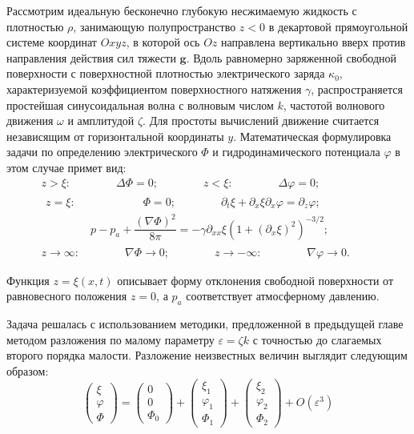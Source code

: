 Рассмотрим идеальную бесконечно глубокую несжимаемую жидкость с плотностью  $ \rho $, занимающую полупространство $ z<0 $  в декартовой прямоугольной системе координат  $ Oxyz $, в которой ось $ Oz $  направлена вертикально вверх против направления действия сил тяжести  $ \mathbf{g} $. Вдоль равномерно заряженной свободной поверхности с поверхностной плотностью электрического заряда  $ \kappa_{0} $, характеризуемой коэффициентом поверхностного натяжения  $ \gamma $, распространяется простейшая синусоидальная волна с волновым числом  $ k $, частотой волнового движения $ \omega $  и амплитудой  $ \zeta $. Для простоты вычислений движение считается независящим от горизонтальной координаты  $ y $. Математическая формулировка задачи по определению электрического $ \Phi $  и гидродинамического потенциала $ \varphi $  в этом случае примет вид:
\begin{gather}
z>\xi: \mspace{72mu} \Delta \Phi
=0; \mspace{72mu} z<\xi: \mspace{72mu} \Delta \varphi = 0;\mspace{72mu}\label{MathFormTFEul}\\
\begin{gathered}
z=\xi:\mspace{108mu} \Phi=0; \mspace{72mu} \partial_{t}\xi+\partial_{x}\xi \partial_{x}\varphi=\partial_{z}\varphi;\mspace{80mu}\\
\mspace{72mu} p-p_{a}+\dfrac{\left(\nabla \Phi \right)^{2}}{8\pi}=-\gamma \partial_{xx}\xi \left(1+\left(\partial_{x}\xi \right)^{2}\right)^{-3/2};
\end{gathered}\\
z\rightarrow \infty: \mspace{72mu}\nabla \Phi \rightarrow 0; \mspace{72mu} z\rightarrow - \infty: \mspace{72mu} \nabla \varphi \rightarrow 0.\mspace{18mu} \label{MathFormTFBesk}
\end{gather}

Функция $ z=\xi\left( x,t \right) $  описывает форму отклонения свободной поверхности от равновесного положения  $ z=0 $, а  $ p_{a} $ соответствует атмосферному давлению.

Задача решалась с использованием методики, предложенной в предыдущей главе методом разложения по малому параметру  $ \varepsilon = \zeta k $ с точностью до слагаемых второго порядка малости. Разложение неизвестных величин выглядит следующим образом:
\begin{equation}
\begin{pmatrix}
\xi\\
\varphi\\
\Phi
\end{pmatrix}=\begin{pmatrix}
0\\
0\\
\Phi_{0}
\end{pmatrix}+\begin{pmatrix}
\xi_{1}\\
\varphi_{1}\\
\Phi_{1}
\end{pmatrix}+\begin{pmatrix}
\xi_{2}\\
\varphi_{2}\\
\Phi_{2}
\end{pmatrix}+O\left( \varepsilon^{3} \right)
\label{RazlozhTF}
\end{equation}

